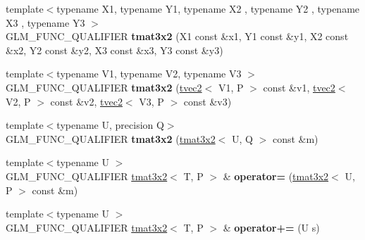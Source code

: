 \begin{DoxyCompactItemize}
\item 
{\footnotesize template$<$typename X1, typename Y1, typename X2 , typename Y2 , typename X3 , typename Y3 $>$ }\\G\+L\+M\+\_\+\+F\+U\+N\+C\+\_\+\+Q\+U\+A\+L\+I\+F\+I\+ER {\bfseries tmat3x2} (X1 const \&x1, Y1 const \&y1, X2 const \&x2, Y2 const \&y2, X3 const \&x3, Y3 const \&y3)\hypertarget{structglm_1_1detail_1_1tmat3x2_ae3a805c23b230b65cc49d3a3d7ca027a}{}\label{structglm_1_1detail_1_1tmat3x2_ae3a805c23b230b65cc49d3a3d7ca027a}

\item 
{\footnotesize template$<$typename V1, typename V2, typename V3 $>$ }\\G\+L\+M\+\_\+\+F\+U\+N\+C\+\_\+\+Q\+U\+A\+L\+I\+F\+I\+ER {\bfseries tmat3x2} (\hyperlink{structglm_1_1detail_1_1tvec2}{tvec2}$<$ V1, P $>$ const \&v1, \hyperlink{structglm_1_1detail_1_1tvec2}{tvec2}$<$ V2, P $>$ const \&v2, \hyperlink{structglm_1_1detail_1_1tvec2}{tvec2}$<$ V3, P $>$ const \&v3)\hypertarget{structglm_1_1detail_1_1tmat3x2_a701537988a37657db53fd40d9b68d364}{}\label{structglm_1_1detail_1_1tmat3x2_a701537988a37657db53fd40d9b68d364}

\item 
{\footnotesize template$<$typename U, precision Q$>$ }\\G\+L\+M\+\_\+\+F\+U\+N\+C\+\_\+\+Q\+U\+A\+L\+I\+F\+I\+ER {\bfseries tmat3x2} (\hyperlink{structglm_1_1detail_1_1tmat3x2}{tmat3x2}$<$ U, Q $>$ const \&m)\hypertarget{structglm_1_1detail_1_1tmat3x2_a81e00e89a4ebf83f1b74bbbc79f5f795}{}\label{structglm_1_1detail_1_1tmat3x2_a81e00e89a4ebf83f1b74bbbc79f5f795}

\item 
{\footnotesize template$<$typename U $>$ }\\G\+L\+M\+\_\+\+F\+U\+N\+C\+\_\+\+Q\+U\+A\+L\+I\+F\+I\+ER \hyperlink{structglm_1_1detail_1_1tmat3x2}{tmat3x2}$<$ T, P $>$ \& {\bfseries operator=} (\hyperlink{structglm_1_1detail_1_1tmat3x2}{tmat3x2}$<$ U, P $>$ const \&m)\hypertarget{structglm_1_1detail_1_1tmat3x2_a309bf07e7e7ba0f6f356d5848407602c}{}\label{structglm_1_1detail_1_1tmat3x2_a309bf07e7e7ba0f6f356d5848407602c}

\item 
{\footnotesize template$<$typename U $>$ }\\G\+L\+M\+\_\+\+F\+U\+N\+C\+\_\+\+Q\+U\+A\+L\+I\+F\+I\+ER \hyperlink{structglm_1_1detail_1_1tmat3x2}{tmat3x2}$<$ T, P $>$ \& {\bfseries operator+=} (U s)\hypertarget{structglm_1_1detail_1_1tmat3x2_a66decc5a8a5a5001d207abeedf367e2a}{}\label{structglm_1_1detail_1_1tmat3x2_a66decc5a8a5a5001d207abeedf367e2a}


\end{DoxyCompactItemize}
